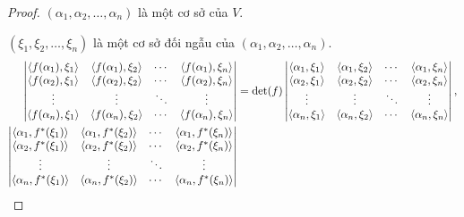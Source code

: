 \documentclass[class=linear-algebra,crop=false]{standalone}
\begin{document}
\begin{proof}
	\par $(\alpha_{1}, \alpha_{2}, \ldots, \alpha_{n})$ là một cơ sở của $V$.
	\par $(\xi_{1}, \xi_{2}, \ldots, \xi_{n})$ là một cơ sở đối ngẫu của $(\alpha_{1}, \alpha_{2}, \ldots, \alpha_{n})$.
	\begingroup{}
	\allowdisplaybreaks{}
	\begin{align*}
		\begin{vmatrix}
			\left\langle{f(\alpha_{1}),\xi_{1}}\right\rangle & \left\langle{f(\alpha_{1}),\xi_{2}}\right\rangle & \cdots & \left\langle{f(\alpha_{1}),\xi_{n}}\right\rangle \\
			\left\langle{f(\alpha_{2}),\xi_{1}}\right\rangle & \left\langle{f(\alpha_{2}),\xi_{2}}\right\rangle & \cdots & \left\langle{f(\alpha_{2}),\xi_{n}}\right\rangle \\
			\vdots                          & \vdots                          & \ddots & \vdots                          \\
			\left\langle{f(\alpha_{n}),\xi_{1}}\right\rangle & \left\langle{f(\alpha_{n}),\xi_{2}}\right\rangle & \cdots & \left\langle{f(\alpha_{n}),\xi_{n}}\right\rangle \\
		\end{vmatrix}
		 & = \det(f)
		\begin{vmatrix}
			\left\langle{\alpha_{1},\xi_{1}}\right\rangle & \left\langle{\alpha_{1},\xi_{2}}\right\rangle & \cdots & \left\langle{\alpha_{1},\xi_{n}}\right\rangle \\
			\left\langle{\alpha_{2},\xi_{1}}\right\rangle & \left\langle{\alpha_{2},\xi_{2}}\right\rangle & \cdots & \left\langle{\alpha_{2},\xi_{n}}\right\rangle \\
			\vdots                       & \vdots                       & \ddots & \vdots                       \\
			\left\langle{\alpha_{n},\xi_{1}}\right\rangle & \left\langle{\alpha_{n},\xi_{2}}\right\rangle & \cdots & \left\langle{\alpha_{n},\xi_{n}}\right\rangle \\
		\end{vmatrix}, \\
		\begin{vmatrix}
			\left\langle{\alpha_{1},f^{*}(\xi_{1})}\right\rangle & \left\langle{\alpha_{1},f^{*}(\xi_{2})}\right\rangle & \cdots & \left\langle{\alpha_{1},f^{*}(\xi_{n})}\right\rangle \\
			\left\langle{\alpha_{2},f^{*}(\xi_{1})}\right\rangle & \left\langle{\alpha_{2},f^{*}(\xi_{2})}\right\rangle & \cdots & \left\langle{\alpha_{2},f^{*}(\xi_{n})}\right\rangle \\
			\vdots                              & \vdots                              & \ddots & \vdots                              \\
			\left\langle{\alpha_{n},f^{*}(\xi_{1})}\right\rangle & \left\langle{\alpha_{n},f^{*}(\xi_{2})}\right\rangle & \cdots & \left\langle{\alpha_{n},f^{*}(\xi_{n})}\right\rangle \\

\end{vmatrix}
\end{align*}
\end{proof}
\end{document}
